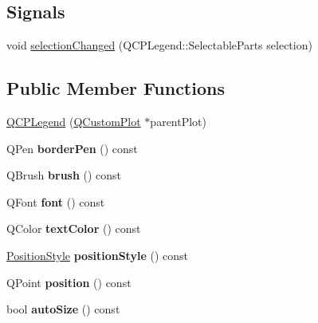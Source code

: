 \subsection*{Signals}
\begin{DoxyCompactItemize}
\item 
void \hyperlink{classQCPLegend_a286149b644d5f5c884a0140219d979f6}{selection\-Changed} (Q\-C\-P\-Legend\-::\-Selectable\-Parts selection)
\end{DoxyCompactItemize}
\subsection*{Public Member Functions}
\begin{DoxyCompactItemize}
\item 
\hyperlink{classQCPLegend_a5dc42d73df80e7294414aee1170c4d2b}{Q\-C\-P\-Legend} (\hyperlink{classQCustomPlot}{Q\-Custom\-Plot} $\ast$parent\-Plot)
\item 
\hypertarget{classQCPLegend_a8ffd92df86ddf43696d95f04a20e3226}{Q\-Pen {\bfseries border\-Pen} () const }\label{classQCPLegend_a8ffd92df86ddf43696d95f04a20e3226}

\item 
\hypertarget{classQCPLegend_a7e5d2766e7d724f399022be8a4e8a2cb}{Q\-Brush {\bfseries brush} () const }\label{classQCPLegend_a7e5d2766e7d724f399022be8a4e8a2cb}

\item 
\hypertarget{classQCPLegend_a5cf8b840bc02f7bf4edb8dde400d0f41}{Q\-Font {\bfseries font} () const }\label{classQCPLegend_a5cf8b840bc02f7bf4edb8dde400d0f41}

\item 
\hypertarget{classQCPLegend_ad60a058af7491f6b140c104c6a0f9458}{Q\-Color {\bfseries text\-Color} () const }\label{classQCPLegend_ad60a058af7491f6b140c104c6a0f9458}

\item 
\hypertarget{classQCPLegend_ae31325a461a55e24f63e63e1419406e8}{\hyperlink{classQCPLegend_aa61c3d82a6c7942dddefbf1ed1f7049f}{Position\-Style} {\bfseries position\-Style} () const }\label{classQCPLegend_ae31325a461a55e24f63e63e1419406e8}

\item 
\hypertarget{classQCPLegend_a2a70d25376ce4a38949900de6bd6b771}{Q\-Point {\bfseries position} () const }\label{classQCPLegend_a2a70d25376ce4a38949900de6bd6b771}

\item 
\hypertarget{classQCPLegend_a71c85db6086156ba661006c9c6f295ee}{bool {\bfseries auto\-Size} () const }\label{classQCPLegend_a71c85db6086156ba661006c9c6f295ee}


\end{DoxyCompactItemize}
